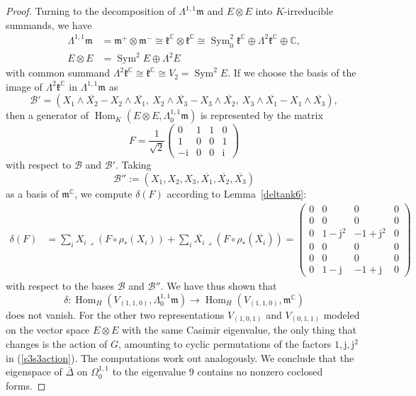 \documentclass[12pt]{scrartcl}
\theoremstyle{plain}
\theoremstyle{definition}
\newcommand{\C}{\mathbb{C}}%
\newcommand{\Sym}{\operatorname{Sym}}%
\newcommand{\Hom}{\operatorname{Hom}}%
\renewcommand{\i}{\mathrm{i}}%
\renewcommand{\j}{\mathrm{j}}%
\newcommand{\m}{\mathfrak{m}}%
\renewcommand{\k}{\mathfrak{k}}%
\begin{document}
\begin{proof}
Turning to the decomposition of $\Lambda^{1,1}\m$ and $E\otimes E$ into $K$-irreducible summands, we have
\begin{align*}
\Lambda^{1,1}\m&=\m^+\otimes\m^-\cong\k^\C\otimes\k^\C\cong\Sym^2_0\k^\C\oplus\Lambda^2\k^\C\oplus\C,\\
E\otimes E&=\Sym^2 E\oplus\Lambda^2 E 
\end{align*}
with common summand $\Lambda^2\k^\C\cong\k^\C\cong V_2=\Sym^2E$. If we choose the basis of the image of $\Lambda^2\k^\C$ in $\Lambda^{1,1}\m$ as
\[\mathcal{B}'=\left(X_1\wedge\overline{X_2}-X_2\wedge\overline{X_1},\ X_2\wedge\overline{X_3}-X_3\wedge\overline{X_2},\ X_3\wedge\overline{X_1}-X_1\wedge\overline{X_3}\right),\]
then a generator of $\Hom_K(E\otimes E,\Lambda^{1,1}_0\m)$ is represented by the matrix
\[F=\frac{1}{\sqrt{2}}\begin{pmatrix}
   0&1&1&0\\
   1&0&0&1\\
   -\i&0&0&\i
  \end{pmatrix}
\]
with respect to $\mathcal{B}$ and $\mathcal{B}'$. Taking
\[\mathcal{B}'':=\left(X_1,X_2,X_3,\overline{X_1},\overline{X_2},\overline{X_3}\right)\]
as a basis of $\m^\C$, we compute $\delta(F)$ according to Lemma~\ref{deltank6}:
\begin{align*}
\delta(F)&=\sum_iX_i\lrcorner(F\circ \rho_\ast(X_i))+\sum_i\overline{X_i}\lrcorner(F\circ \rho_\ast(\overline{X_i}))=\begin{pmatrix}
           0&0&0&0\\
           0&0&0&0\\
           0&1-\j^2&-1+\j^2&0\\
           0&0&0&0\\
           0&0&0&0\\
           0&1-\j&-1+\j&0
          \end{pmatrix}
\end{align*}
with respect to the bases $\mathcal{B}$ and $\mathcal{B}''$. We have thus shown that
\[\delta: \Hom_H(V_{(1,1,0)},\Lambda^{1,1}_0\m)\to\Hom_H(V_{(1,1,0)},\m^\C)\]
does not vanish. For the other two representations $V_{(1,0,1)}$ and $V_{(0,1,1)}$ modeled on the vector space $E\otimes E$ with the same Casimir eigenvalue, the only thing that changes is the action of $G$, amounting to cyclic permutations of the factors $1,\j,\j^2$ in (\ref{s3s3action}). The computations work out analogously. We conclude that the eigenspace of $\bar\Delta$ on $\Omega^{1,1}_0$ to the eigenvalue $9$ contains no nonzero coclosed forms.
\end{proof}
\end{document}
